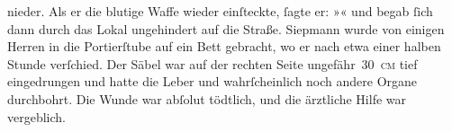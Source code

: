                nieder. Als er die blutige Waffe wieder einſteckte,{ }ſagte er: »« und begab{ }ſich dann durch das Lokal ungehindert auf die
               Straße. Siepmann wurde von einigen Herren in
               die Portierſtube auf ein Bett gebracht, wo er nach etwa einer halben Stunde
               verſchied. Der Säbel war auf der rechten Seite ungefähr 30 \textsc{cm}
               tief eingedrungen und hatte die Leber und wahrſcheinlich noch andere Organe
               durchbohrt. Die Wunde war abſolut tödtlich, und die ärztliche Hilfe war
               vergeblich.\pend
           \endnumbering{}  \newcommand{\dateiname}{L02787}\newcommand{\titel}{Paul Goldmann an Arthur Schnitzler, 17. 10. [1896]}\newcommand{\editorInnen}{Martin Anton Müller und Laura Untner}
